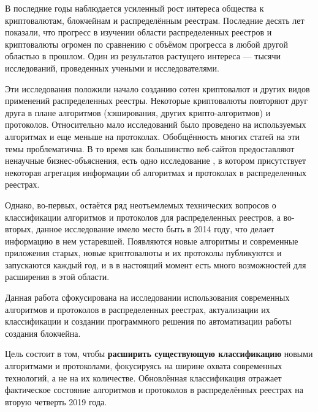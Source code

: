 \tab[0.88cm]В последние годы наблюдается усиленный рост интереса общества к криптовалютам,
блокчейнам и распределённым реестрам.
Последние десять лет показали, что прогресс в изучении области распределенных
реестров и криптовалюты огромен по сравнению с объёмом прогресса в любой
другой областью в прошлом.
Один из результатов растущего интереса --- тысячи исследований,
проведенных учеными и исследователями.

Эти исследования положили начало созданию сотен криптовалют и других видов
применений распределенных реестры.  Некоторые криптовалюты повторяют друг
друга в плане алгоритмов (хэширования, других крипто-алгоритмов) и протоколов.
Относительно мало исследований было проведено на
используемых алгоритмах и еще меньше на протоколах. Обобщённость многих статей на
эти темы проблематична. В то время как большинство веб-сайтов предоставляют
ненаучные бизнес-объяснения, есть одно исследование \cite{TimSwanson2014}, в
котором присутствует некоторая агрегация информации об алгоритмах и протоколах
в распределенных реестрах.

Однако, во-первых, остаётся ряд неотъемлемых технических вопросов о
классификации алгоритмов и протоколов для распределенных реестров, а во-вторых,
данное исследование имело место быть в 2014 году, что делает информацию в нем
устаревшей.  Появляются новые алгоритмы и современные приложения старых, новые
криптовалюты и их протоколы публикуются и запускаются каждый год, и в в
настоящий момент есть много возможностей для расширения в этой области.

Данная работа сфокусирована на исследовании использования современных
алгоритмов и протоколов в распределенных реестрах, актуализации их
классификации и создании программного решения по автоматизации работы создания
блокчейна.

Цель состоит в том, чтобы \textbf{расширить существующую классификацию}
новыми алгоритмами и протоколами, фокусируясь на ширине охвата современных
технологий, а не на их количестве. Обновлённая классификация отражает
фактическое состояние алгоритмов и протоколов в распределённых реестрах на
вторую четверть 2019 года.

